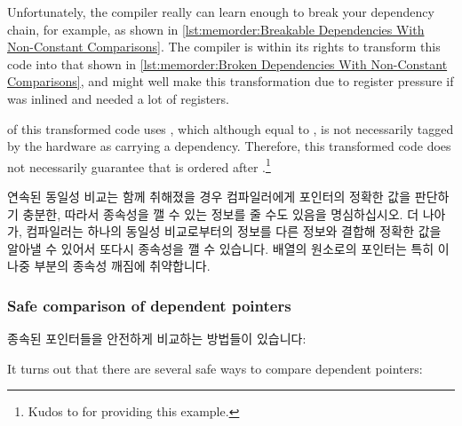 {{	Unfortunately, the compiler really can learn enough to
	break your dependency chain, for example, as shown in
	\cref{lst:memorder:Breakable Dependencies With Non-Constant Comparisons}.
	The compiler is within its rights to transform this code
	into that shown in
	\cref{lst:memorder:Broken Dependencies With Non-Constant Comparisons},
	and might well make this transformation due to register pressure
	if  was inlined and needed a lot of registers.
	\begin{fcvref}
	 of this transformed code uses , which although
	equal to , is not necessarily tagged by the hardware as
	carrying a dependency.
	Therefore, this transformed code does not necessarily guarantee
	that  is ordered after .\footnote{
		Kudos to  for providing this example.}
	\end{fcvref}

	\fi

}\QuickQuizEndE
}

연속된 동일성 비교는 함께 취해졌을 경우 컴파일러에게 포인터의 정확한 값을
판단하기 충분한, 따라서 종속성을 깰 수 있는 정보를 줄 수도 있음을 명심하십시오.
더 나아가, 컴파일러는 하나의 동일성 비교로부터의 정보를 다른 정보와 결합해
정확한 값을 알아낼 수 있어서 또다시 종속성을 깰 수 있습니다.
배열의 원소로의 포인터는 특히 이 나중 부분의 종속성 깨짐에 취약합니다.

\subsubsection{Safe comparison of dependent pointers}
종속된 포인터들을 안전하게 비교하는 방법들이 있습니다:

\iffalse

It turns out that there are several safe ways to compare dependent
pointers:

